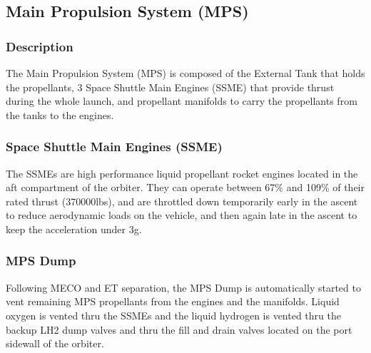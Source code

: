 \documentclass[Space_Shuttle_Ultra_Manual.tex]{subfiles}
\begin{document}
\subsection{Main Propulsion System (MPS)}
\begin{multicols*}{2}
\renewcommand{\cfttoctitlefont}{\bf}
\localtableofcontents
\subsubsection{Description}
The Main Propulsion System (MPS) is composed of the External Tank that holds the propellants, 3 Space Shuttle Main Engines (SSME) that provide thrust during the whole launch, and propellant manifolds to carry the propellants from the tanks to the engines.
\subsubsection{Space Shuttle Main Engines (SSME)}
The SSMEs are high performance liquid propellant rocket engines located in the aft compartment of the orbiter. They can operate between 67\% and 109\% of their rated thrust (370000lbs), and are throttled down temporarily early in the ascent to reduce aerodynamic loads on the vehicle, and then again late in the ascent to keep the acceleration under 3g.
\subsubsection{MPS Dump}
Following MECO and ET separation, the MPS Dump is automatically started to vent remaining MPS propellants from the engines and the manifolds. Liquid oxygen is vented thru the SSMEs and the liquid hydrogen is vented thru the backup LH2 dump valves and thru the fill and drain valves located on the port sidewall of the orbiter.
\end{multicols*}
\end{document}
